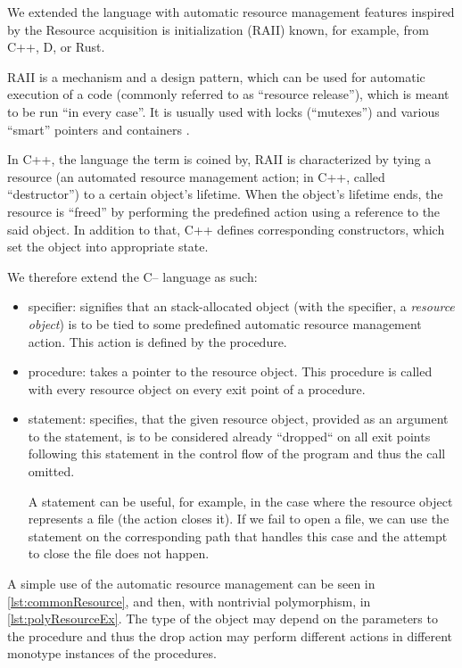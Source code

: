 We extended the \cmm language with automatic resource management features inspired by the Resource acquisition is initialization (RAII) known, for example, from C++, D, or Rust.

RAII is a mechanism and a design pattern, which can be used for automatic execution of a code (commonly referred to as ``resource release''), which is meant to be run ``in every case''. It is usually used with locks (``mutexes'') and various ``smart'' pointers and containers \cite{obiltschnigusing}.

In C++, the language the term is coined by, RAII is characterized by tying a resource (an automated resource management action; in C++, called ``destructor'') to a certain object's lifetime. When the object's lifetime ends, the resource is ``freed'' by performing the predefined action using a reference to the said object. In addition to that, C++ defines corresponding constructors, which set the object into appropriate state.

We therefore extend the C-- language as such:

\begin{itemize}
    \item {} specifier: signifies that an stack-allocated object (with the  specifier, a \emph{resource object}) is to be tied to some predefined automatic resource management action. This action is defined by the  procedure.

    \item {} procedure: takes a pointer to the resource object. This procedure is called with every resource object on every exit point of a procedure.

    \item {} statement: specifies, that the given resource object, provided as an argument to the  statement, is to be considered already ``dropped`` on all exit points following this statement in the control flow of the program and thus the  call omitted.

    A  statement can be useful, for example, in the case where the resource object represents a file (the  action closes it). If we fail to open a file, we can use the  statement on the corresponding path that handles this case and the attempt to close the file does not happen.
\end{itemize}

A simple use of the automatic resource management can be seen in \cref{lst:commonResource}, and then, with nontrivial polymorphism, in \cref{lst:polyResourceEx}. The type of the object may depend on the parameters to the procedure and thus the drop action may perform different actions in different monotype instances of the procedures.

